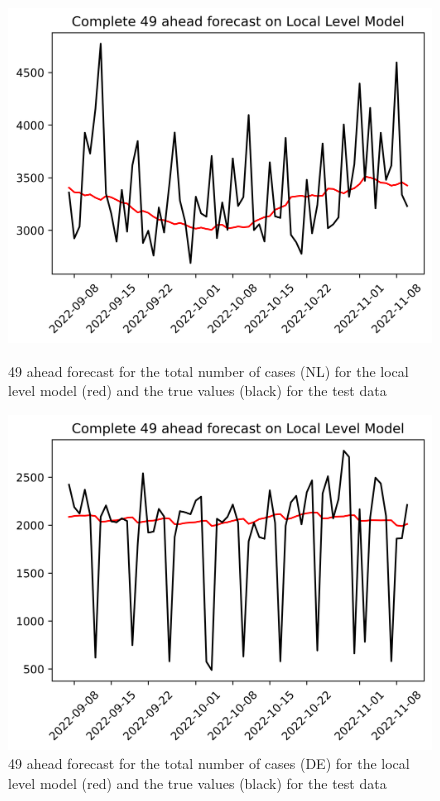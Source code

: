 \begin{figure}

\begin{minipage}{.45\textwidth}
  \centering
  \includegraphics[width=\linewidth]{pics/49_ah/Complete_49_ahead_Local Level Model.png}
  \caption{49 ahead forecast for the total number of cases (NL) for the local level model (red) and the true values (black) for the test data}
  \label{fig:tot_cases_fc_49_LLM}
\end{minipage}
\begin{minipage}{.45\textwidth}
  \centering
  \includegraphics[width=\linewidth]{pics/49_ah/DE_Complete_49_ahead_Local Level Model.png}
  \caption{49 ahead forecast for the total number of cases (DE) for the local level model (red) and the true values (black) for the test data}
  \label{fig:tot_cases_fc_49_LLM_DE}
\end{minipage}

\end{figure}
